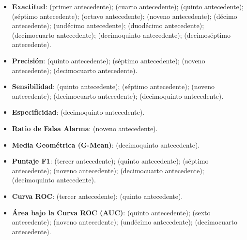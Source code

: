 \begin{itemize}
	\item \textbf{Exactitud}: \cite{pr_chen2013kickpredict} (primer antecedente); \cite{pr_chen2015predcrowd} (cuarto antecedente); \cite{pr_beckwith2016predcrowd} (quinto antecedente); \cite{pr_yuan2016textanalytics} (séptimo antecedente); \cite{pr_sawhney2016usingLT} (octavo antecedente); \cite{pr_kaur2017socmedcrowd} (noveno antecedente); \cite{pr_kamath2018suplearn} (décimo antecedente); \cite{pr_yu2018deeplearning} (undécimo antecedente); \cite{pr_lee2018contentDL} (duodécimo antecedente); \cite{pr_cheng2019deeplearning} (decimocuarto antecedente); \cite{pr_chen2019keywords_crowdfunding} (decimoquinto antecedente); \cite{pr_shafqat2019topicpredictions} (decimoséptimo antecedente).
	\item \textbf{Precisión}: \cite{pr_beckwith2016predcrowd} (quinto antecedente); \cite{pr_yuan2016textanalytics} (séptimo antecedente); \cite{pr_kaur2017socmedcrowd} (noveno antecedente); \cite{pr_cheng2019deeplearning} (decimocuarto antecedente).
	\item \textbf{Sensibilidad}: \cite{pr_beckwith2016predcrowd} (quinto antecedente); \cite{pr_yuan2016textanalytics} (séptimo antecedente); \cite{pr_kaur2017socmedcrowd} (noveno antecedente); \cite{pr_cheng2019deeplearning} (decimocuarto antecedente); \cite{pr_chen2019keywords_crowdfunding} (decimoquinto antecedente).
	\item \textbf{Especificidad}: \cite{pr_chen2019keywords_crowdfunding} (decimoquinto antecedente).
	\item \textbf{Ratio de Falsa Alarma}: \cite{pr_kaur2017socmedcrowd} (noveno antecedente).
	\item \textbf{Media Geométrica (G-Mean)}: \cite{pr_chen2019keywords_crowdfunding} (decimoquinto antecedente).
	\item \textbf{Puntaje F1}: \cite{pr_zhou2015projectdesc} (tercer antecedente); \cite{pr_beckwith2016predcrowd} (quinto antecedente); \cite{pr_yuan2016textanalytics} (séptimo antecedente); \cite{pr_kaur2017socmedcrowd} (noveno antecedente); \cite{pr_cheng2019deeplearning} (decimocuarto antecedente); \cite{pr_chen2019keywords_crowdfunding} (decimoquinto antecedente).
	\item \textbf{Curva ROC}: \cite{pr_zhou2015projectdesc} (tercer antecedente); \cite{pr_beckwith2016predcrowd} (quinto antecedente).
	\item \textbf{Área bajo la Curva ROC (AUC)}: \cite{pr_beckwith2016predcrowd} (quinto antecedente); \cite{pr_li2016predcrowd} (sexto antecedente); \cite{pr_kaur2017socmedcrowd} (noveno antecedente); \cite{pr_yu2018deeplearning} (undécimo antecedente); \cite{pr_cheng2019deeplearning} (decimocuarto antecedente).

\end{itemize}
